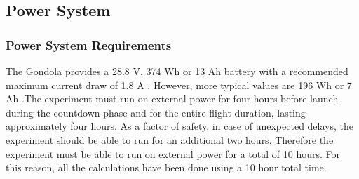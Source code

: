 \documentclass[a4paper,12pt,twoside]{article}
\begin{document}
\pagebreak
\subsection{Power System}

\subsubsection{Power System Requirements}
\begin{centering}
The Gondola provides a 28.8 V, 374 Wh or 13 Ah battery with a recommended maximum current draw of 1.8 A . However, more typical values are 196 Wh or 7 Ah \cite{BexusManual}.The experiment must run on external power for four hours before launch during the countdown phase and for the entire flight duration, lasting approximately four hours. As a factor of safety, in case of unexpected delays, the experiment should be able to run for an additional two hours. Therefore the experiment must be able to run on external power for a total of 10 hours. For this reason, all the calculations have been done using a 10 hour total time.
\end{centering}
\end{document}
